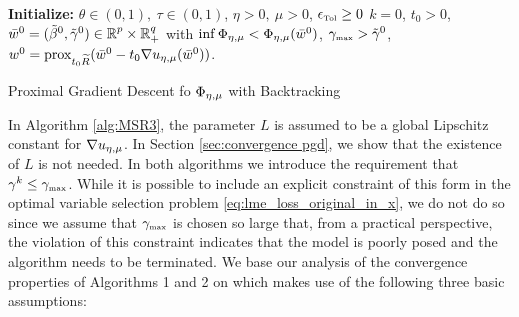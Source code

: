 



\begin{algorithm}[ht]
\SetAlgoLined
{\bf Initialize:} 
$\theta\in(0,1),\ \tau\in(0,1)$,
$\eta>0,\ \mu>0$, $\epsilon_{\mbox{\tiny Tol}}\ge 0$
$k=0$, $t_0>0$, ${\bar w}^{0}=(\tilde\beta^0,{\tilde{\gamma}}^0)\in {\operatorname{\mathbb{R}}^p}\times\operatorname{\mathbb{R}}^q_+$
with $\inf\Phi_{\eta,\mu} <\Phi_{\eta,\mu}({\bar w}^0)$, 
${\gamma_{\mbox{\tiny max}}}>{\tilde{\gamma}}^0$, 
$w^0={\mathrm{prox}}_{t_0{\widetilde R}}({\bar w}^{0}-t_0\nabla u_{\eta,\mu}({\bar w}^0))$.
\\
\smallskip
\caption{\label{alg:pgd with bt}Proximal Gradient Descent 
fo $\Phi_{\eta,\mu}$ with Backtracking}
\end{algorithm}
\medskip


In Algorithm \ref{alg:MSR3}, 
the parameter $L$ is assumed to be a global Lipschitz
constant for $\nabla {u_{\eta,\mu}}$. In Section \ref{sec:convergence pgd}, we show that the existence of $L$ is not needed.
In both algorithms we introduce the requirement that $\gamma^k\le{\gamma_{\mbox{\tiny max}}}$.
While it is possible to include an explicit constraint of this form in the 
optimal variable selection problem \eqref{eq:lme_loss_original_in_x}, 
we do not do so since we assume that ${\gamma_{\mbox{\tiny max}}}$ is chosen 
so large that, from a practical perspective, 
the violation of this constraint indicates that the model is 
poorly posed and the algorithm needs to be terminated.
We base our analysis of the convergence properties of
Algorithms 1 and 2 on \cite[Theorem 10.15]{AB17} which makes use
of the following three basic assumptions:
\smallskip

